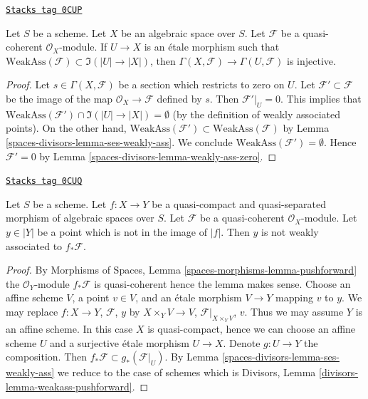 \begin{lemma}
\label{spaces-divisors-lemma-restriction-injective-open-contains-weakly-ass}
\href{https://stacks.math.columbia.edu/tag/0CUP}{\texttt{Stacks tag 0CUP}}

Let $S$ be a scheme. Let $X$ be an algebraic space over $S$.
Let $\mathcal{F}$ be a quasi-coherent $\mathcal{O}_X$-module.
If $U \to X$ is an \'etale morphism such that
$\text{WeakAss}(\mathcal{F}) \subset \Im(|U| \to |X|)$, then
$\Gamma(X, \mathcal{F}) \to \Gamma(U, \mathcal{F})$ is injective.
\end{lemma}

\begin{proof}
Let $s \in \Gamma(X, \mathcal{F})$ be a section which restricts to zero on $U$.
Let $\mathcal{F}' \subset \mathcal{F}$ be the image of the map
$\mathcal{O}_X \to \mathcal{F}$ defined by $s$. Then $\mathcal{F}'|_U = 0$.
This implies that
$\text{WeakAss}(\mathcal{F}') \cap \Im(|U| \to |X|) = \emptyset$
(by the definition of weakly associated points).
On the other hand,
$\text{WeakAss}(\mathcal{F}') \subset \text{WeakAss}(\mathcal{F})$
by Lemma \ref{spaces-divisors-lemma-ses-weakly-ass}. We conclude
$\text{WeakAss}(\mathcal{F}') = \emptyset$.
Hence $\mathcal{F}' = 0$ by Lemma \ref{spaces-divisors-lemma-weakly-ass-zero}.
\end{proof}

\begin{lemma}
\label{spaces-divisors-lemma-weakass-pushforward}
\href{https://stacks.math.columbia.edu/tag/0CUQ}{\texttt{Stacks tag 0CUQ}}

Let $S$ be a scheme. Let $f : X \to Y$ be a quasi-compact and quasi-separated
morphism of algebraic spaces over $S$. Let $\mathcal{F}$ be a quasi-coherent
$\mathcal{O}_X$-module. Let $y \in |Y|$ be a point which is not in the
image of $|f|$. Then $y$ is not weakly associated to $f_*\mathcal{F}$.
\end{lemma}

\begin{proof}
By Morphisms of Spaces, Lemma \ref{spaces-morphisms-lemma-pushforward}
the $\mathcal{O}_Y$-module $f_*\mathcal{F}$ is quasi-coherent hence
the lemma makes sense.
Choose an affine scheme $V$, a point $v \in V$, and an \'etale morphism
$V \to Y$ mapping $v$ to $y$. We may replace
$f : X \to Y$, $\mathcal{F}$, $y$ by
$X \times_Y V \to V$, $\mathcal{F}|_{X \times_Y V}$, $v$.
Thus we may assume $Y$ is an affine scheme.
In this case $X$ is quasi-compact, hence we can choose
an affine scheme $U$ and a surjective \'etale morphism $U \to X$.
Denote $g : U \to Y$ the composition.
Then $f_*\mathcal{F} \subset g_*(\mathcal{F}|_U)$.
By Lemma \ref{spaces-divisors-lemma-ses-weakly-ass}
we reduce to the case of schemes which is
Divisors, Lemma \ref{divisors-lemma-weakass-pushforward}.
\end{proof}

